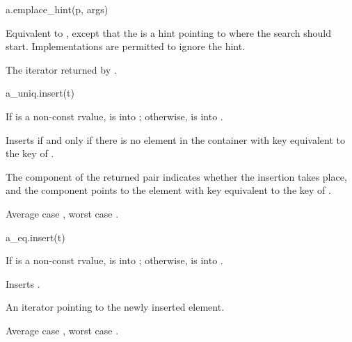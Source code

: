 %
\begin{itemdecl}
a.emplace_hint(p, args)
\end{itemdecl}

\begin{itemdescr}
\pnum
\result
{}

\pnum
\effects
Equivalent to ,
except that the   is a hint
pointing to where the search should start.
Implementations are permitted to ignore the hint.

\pnum
\returns
The iterator returned by .
\end{itemdescr}

%
\begin{itemdecl}
a_uniq.insert(t)
\end{itemdecl}

\begin{itemdescr}
\pnum
\result
{}

\pnum
\expects
If  is a non-const rvalue,
 is  into ;
otherwise,  is  into .

\pnum
\effects
Inserts  if and only if there is no element in the container
with key equivalent to the key of .

\pnum
\returns
The  component of the returned pair indicates
whether the insertion takes place, and
the  component points to
the element with key equivalent to the key of .

\pnum
\complexity
Average case , worst case .
\end{itemdescr}

%
\begin{itemdecl}
a_eq.insert(t)
\end{itemdecl}

\begin{itemdescr}
\pnum
\result
{}

\pnum
\expects
If  is a non-const rvalue,
 is  into ;
otherwise,  is  into .

\pnum
\effects
Inserts .

\pnum
\returns
An iterator pointing to the newly inserted element.

\pnum
\complexity
Average case , worst case .
\end{itemdescr}

